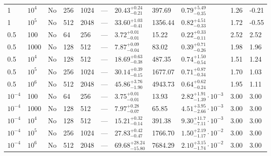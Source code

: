 \documentclass[aps, prfluids, onecolumn, notitlepage, nofootinbib, groupedaddress, amsfonts, amssymb, amsmath]{revtex4-1}
\begin{document}
\begin{center}
\begin{longtable}{ p{1cm} p{1cm} p{1cm} p{1cm} p{1cm} p{1cm} p{1.75cm} p{1.5cm} p{2.75cm} p{1cm} p{1.2cm}  }
\vspace{0.08cm}1	&	$10^4$	&	No	&	256	&	1024	&	---	&$	20.43	_{-	0.21	}^{+	0.24	}$&	397.69	&$	0.79	_{-	0.35	}^{+	5.49	}$&	1.26	&	-0.21	\\
\vspace{0.08cm}1	&	$10^5$	&	No	&	512	&	2048	&	---	&$	33.60	_{-	0.41	}^{+	1.03	}$&	1356.44	&$	0.82	_{-	0.33	}^{+	4.51	}$&	1.72	&	-0.55	\\
\vspace{0.08cm}0.5	&	100	&	No	&	64	&	256	&	---	&$	3.72	_{-	0.01	}^{+	0.01	}$&	15.22	&$	0.22	_{-	0.11	}^{+	0.33	}$&	2.52	&	2.52	\\
\vspace{0.08cm}0.5	&	1000	&	No	&	128	&	512	&	---	&$	7.87	_{-	0.04	}^{+	0.09	}$&	83.02	&$	0.39	_{-	0.26	}^{+	0.71	}$&	1.98	&	1.96	\\
\vspace{0.08cm}0.5	&	$10^4$	&	No	&	128	&	512	&	---	&$	18.69	_{-	0.38	}^{+	0.63	}$&	487.35	&$	0.74	_{-	0.54	}^{+	1.50	}$&	1.51	&	1.24	\\
\vspace{0.08cm}0.5	&	$10^5$	&	No	&	256	&	1024	&	---	&$	30.14	_{-	0.15	}^{+	0.39	}$&	1677.07	&$	0.71	_{-	0.34	}^{+	0.87	}$&	1.70	&	1.03	\\
\vspace{0.08cm}0.5	&	$10^6$	&	No	&	512	&	2048	&	---	&$	45.86	_{-	1.90	}^{+	3.76	}$&	4943.73	&$	0.64	_{-	0.24	}^{+	0.62	}$&	1.95	&	1.11	\\
\vspace{0.08cm}$10^{-4}$	&	100	&	No	&	64	&	256	&	---	&$	3.75	_{-	0.01	}^{+	0.01	}$&	13.93	&$	2.82	_{-	1.39	}^{+	1.91}\cdot 10^{-3}	$&	3.00	&	3.00	\\
\vspace{0.08cm}$10^{-4}$	&	1000	&	No	&	128	&	512	&	---	&$	7.97	_{-	0.07	}^{+	0.28	}$&	65.85	&$	4.51	_{-	2.66	}^{+	3.95}\cdot 10^{-3}	$&	3.00	&	3.00	\\
\vspace{0.08cm}$10^{-4}$	&	$10^4$	&	No	&	128	&	512	&	---	&$	15.21	_{-	0.14	}^{+	0.32	}$&	391.38	&$	9.30	_{-	7.11	}^{+	11.7}\cdot 10^{-3}	$&	3.00	&	3.00	\\
\vspace{0.08cm}$10^{-4}$	&	$10^5$	&	No	&	256	&	1024	&	---	&$	27.83	_{-	0.47	}^{+	0.42	}$&	1766.70	&$	1.50	_{-	1.17	}^{+	2.19}\cdot 10^{-2}	$&	3.00	&	3.00	\\
\vspace{0.08cm}$10^{-4}$	&	$10^6$	&	No	&	512	&	2048	&	---	&$	69.68	_{-	15.80	}^{+	28.24	}$&	7684.29	&$	2.10	_{-	1.74	}^{+	3.15}\cdot 10^{-2}	$&	3.00	&	3.00	\\

\end{longtable}
\end{center}
\end{document}
